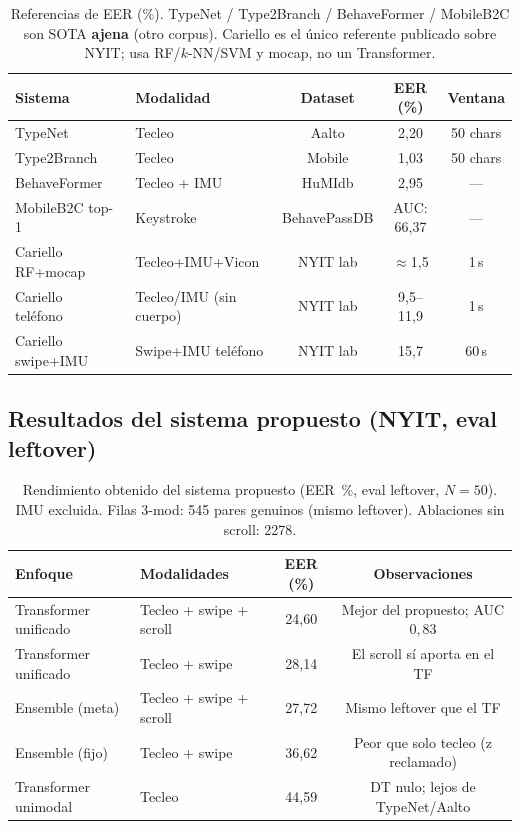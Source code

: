 \begin{table}[h]
\centering
\caption{Referencias de EER (\%). TypeNet / Type2Branch / BehaveFormer / MobileB2C son SOTA \textbf{ajena}
(otro corpus). Cariello es el único referente publicado sobre NYIT; usa RF/$k$-NN/SVM y mocap, no un Transformer.}\label{tab:baseline}
\begin{tabular}{llccc}
\toprule
\textbf{Sistema} & \textbf{Modalidad} & \textbf{Dataset} & \textbf{EER (\%)} & \textbf{Ventana} \\
\midrule
TypeNet~\cite{acien2022typenet}             & Tecleo              & Aalto      & 2{,}20 & 50 chars \\
Type2Branch~\cite{gonzalez2025type2branch}  & Tecleo              & Mobile     & 1{,}03 & 50 chars \\
BehaveFormer~\cite{senerath2023behaveformer}& Tecleo + IMU        & HuMIdb     & 2{,}95 & ---      \\
MobileB2C top-1~\cite{stragapede2022mobileb2c} & Keystroke        & BehavePassDB & \multicolumn{1}{c}{AUC: 66{,}37} & --- \\
\midrule
Cariello RF+mocap~\cite{cariello2026keystroke} & Tecleo+IMU+Vicon & NYIT lab & $\approx$1{,}5 & 1\,s \\
Cariello teléfono~\cite{cariello2026keystroke} & Tecleo/IMU (sin cuerpo) & NYIT lab & 9{,}5--11{,}9 & 1\,s \\
Cariello swipe+IMU~\cite{cariello2025posture} & Swipe+IMU teléfono & NYIT lab & 15{,}7 & 60\,s \\
\bottomrule
\end{tabular}
\end{table}

\subsection{Resultados del sistema propuesto (NYIT, eval leftover)}

\begin{table}[h]
\centering
\caption{Rendimiento obtenido del sistema propuesto (EER~\%, eval leftover, $N=50$). 
IMU excluida. Filas 3-mod: 545 pares genuinos (mismo leftover). Ablaciones sin scroll: 2278.}\label{tab:resultados_esperados}
\begin{tabular}{llcc}
\toprule
\textbf{Enfoque} & \textbf{Modalidades} & \textbf{EER (\%)} & \textbf{Observaciones} \\
\midrule
Transformer unificado  & Tecleo + swipe + scroll & 24{,}60 & Mejor del propuesto; AUC $0{,}83$ \\
Transformer unificado  & Tecleo + swipe          & 28{,}14 & El scroll sí aporta en el TF \\
Ensemble (meta)        & Tecleo + swipe + scroll & 27{,}72 & Mismo leftover que el TF \\
Ensemble (fijo)        & Tecleo + swipe          & 36{,}62 & Peor que solo tecleo (z reclamado) \\
Transformer unimodal   & Tecleo                  & 44{,}59 & DT nulo; lejos de TypeNet/Aalto \\
\bottomrule
\end{tabular}
\end{table}

